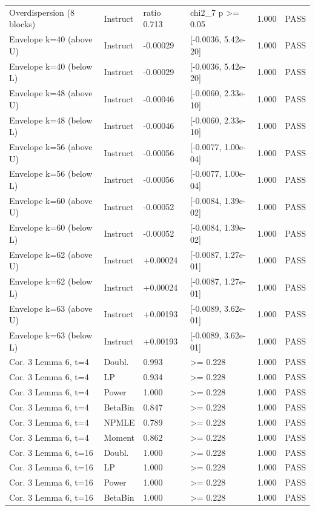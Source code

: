 \begin{table}[t]
\begin{tabular}{p{1.25in}lp{0.9in}p{0.85in}rl}
Overdispersion (8 blocks) & Instruct & ratio 0.713 & chi2\_7 p >= 0.05 & 1.000 & PASS \\
Envelope k=40 (above U) & Instruct & -0.00029 & [-0.0036, 5.42e-20] & 1.000 & PASS \\
Envelope k=40 (below L) & Instruct & -0.00029 & [-0.0036, 5.42e-20] & 1.000 & PASS \\
Envelope k=48 (above U) & Instruct & -0.00046 & [-0.0060, 2.33e-10] & 1.000 & PASS \\
Envelope k=48 (below L) & Instruct & -0.00046 & [-0.0060, 2.33e-10] & 1.000 & PASS \\
Envelope k=56 (above U) & Instruct & -0.00056 & [-0.0077, 1.00e-04] & 1.000 & PASS \\
Envelope k=56 (below L) & Instruct & -0.00056 & [-0.0077, 1.00e-04] & 1.000 & PASS \\
Envelope k=60 (above U) & Instruct & -0.00052 & [-0.0084, 1.39e-02] & 1.000 & PASS \\
Envelope k=60 (below L) & Instruct & -0.00052 & [-0.0084, 1.39e-02] & 1.000 & PASS \\
Envelope k=62 (above U) & Instruct & +0.00024 & [-0.0087, 1.27e-01] & 1.000 & PASS \\
Envelope k=62 (below L) & Instruct & +0.00024 & [-0.0087, 1.27e-01] & 1.000 & PASS \\
Envelope k=63 (above U) & Instruct & +0.00193 & [-0.0089, 3.62e-01] & 1.000 & PASS \\
Envelope k=63 (below L) & Instruct & +0.00193 & [-0.0089, 3.62e-01] & 1.000 & PASS \\
Cor. 3 Lemma 6, t=4 & Doubl. & 0.993 & >= 0.228 & 1.000 & PASS \\
Cor. 3 Lemma 6, t=4 & LP & 0.934 & >= 0.228 & 1.000 & PASS \\
Cor. 3 Lemma 6, t=4 & Power & 1.000 & >= 0.228 & 1.000 & PASS \\
Cor. 3 Lemma 6, t=4 & BetaBin & 0.847 & >= 0.228 & 1.000 & PASS \\
Cor. 3 Lemma 6, t=4 & NPMLE & 0.789 & >= 0.228 & 1.000 & PASS \\
Cor. 3 Lemma 6, t=4 & Moment & 0.862 & >= 0.228 & 1.000 & PASS \\
Cor. 3 Lemma 6, t=16 & Doubl. & 1.000 & >= 0.228 & 1.000 & PASS \\
Cor. 3 Lemma 6, t=16 & LP & 1.000 & >= 0.228 & 1.000 & PASS \\
Cor. 3 Lemma 6, t=16 & Power & 1.000 & >= 0.228 & 1.000 & PASS \\
Cor. 3 Lemma 6, t=16 & BetaBin & 1.000 & >= 0.228 & 1.000 & PASS \\

\end{tabular}
\end{table}
